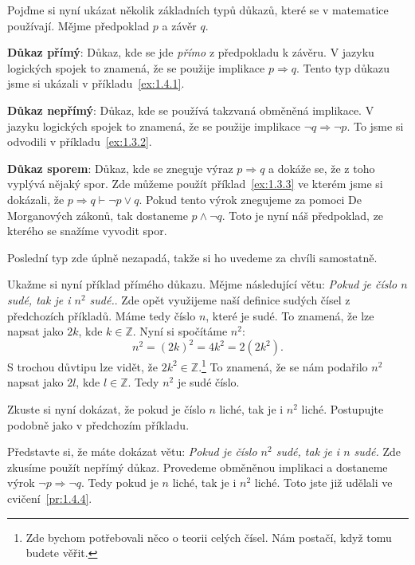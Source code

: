 \begin{definitionbox}
  Pojďme si nyní ukázat několik základních typů důkazů, které se v matematice používají. Mějme předpoklad $p$ a závěr $q$.

  \textbf{Důkaz přímý}: Důkaz, kde se jde \textit{přímo} z předpokladu k závěru. V jazyku logických spojek to znamená, že se použije implikace $p \Rightarrow q$. Tento typ důkazu jsme si ukázali v příkladu~\ref{ex:1.4.1}.

  \textbf{Důkaz nepřímý}: Důkaz, kde se používá takzvaná obměněná implikace. V jazyku logických spojek to znamená, že se použije implikace $\neg q \Rightarrow \neg p$. To jsme si odvodili v příkladu~\ref{ex:1.3.2}.

  \textbf{Důkaz sporem}: Důkaz, kde se zneguje výraz $p \Rightarrow q$ a dokáže se, že z toho vyplývá nějaký spor. Zde můžeme použít příklad~\ref{ex:1.3.3} ve kterém jsme si dokázali, že $p\Rightarrow q \vdash \neg p \lor q$. Pokud tento výrok znegujeme za pomoci De Morganových zákonů, tak dostaneme $p \land \neg q$. Toto je nyní náš předpoklad, ze kterého se snažíme vyvodit spor. 

  \vspace{0.1cm}

  Poslední typ zde úplně nezapadá, takže si ho uvedeme za chvíli samostatně.
\end{definitionbox}

\begin{example}
  Ukažme si nyní příklad přímého důkazu. Mějme následující větu: \textit{Pokud je číslo $n$ sudé, tak je i $n^2$ sudé.}. Zde opět využijeme naší definice sudých čísel z předchozích příkladů. Máme tedy číslo $n$, které je sudé. To znamená, že lze napsat jako $2k$, kde $k\in\mathbb{Z}$. Nyní si spočítáme $n^2$: 
  \begin{equation}
    n^2 = (2k)^2 = 4k^2 = 2(2k^2).
  \end{equation}
  S trochou důvtipu lze vidět, že $2k^2 \in \mathbb{Z}$.\footnote{Zde bychom potřebovali něco o teorii celých čísel. Nám postačí, když tomu budete věřit.} To znamená, že se nám podařilo $n^2$ napsat jako $2l$, kde $l\in\mathbb{Z}$. Tedy $n^2$ je sudé číslo.
\end{example}
\begin{problem}
  Zkuste si nyní dokázat, že pokud je číslo $n$ liché, tak je i $n^2$ liché. Postupujte podobně jako v předchozím příkladu.
\end{problem}

\begin{example} 
  Představte si, že máte dokázat větu: \textit{Pokud je číslo $n^2$ sudé, tak je i $n$ sudé.} Zde zkusíme použít nepřímý důkaz. Provedeme obměněnou implikaci a dostaneme výrok $\neg p \Rightarrow \neg q$. Tedy pokud je $n$ liché, tak je i $n^2$ liché. Toto jste již udělali ve cvičení~\ref{pr:1.4.4}.
\end{example}

